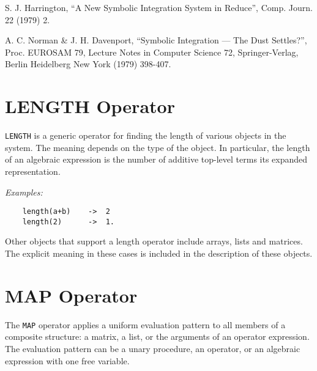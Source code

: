 	S. J. Harrington, ``A New Symbolic Integration System in Reduce'',
		Comp. Journ. 22 (1979) 2.

	A. C. Norman \& J. H. Davenport, ``Symbolic Integration --- The Dust
		Settles?'', Proc. EUROSAM 79, Lecture Notes in Computer
		Science 72, Springer-Verlag, Berlin Heidelberg New York
		(1979) 398-407.

%
%
%

\section{LENGTH Operator}
\hypertarget{operator:LENGTH}{}
{\tt LENGTH} is a generic operator for finding the
length of various objects in the system.  The meaning depends on the type
of the object.  In particular, the length of an algebraic expression is
the number of additive top-level terms its expanded representation.

{\it Examples:}
\begin{verbatim}
	length(a+b)    ->  2
	length(2)      ->  1.
\end{verbatim}
Other objects that support a length operator include arrays, lists and
matrices. The explicit meaning in these cases is included in the description
of these objects.

\section{MAP Operator}
\hypertarget{operator:MAP}{}

The {\tt MAP} operator applies a uniform evaluation pattern to all members
of a composite structure: a matrix, a list, or the arguments of an
operator expression.  The evaluation pattern can be a unary procedure, an
operator, or an algebraic expression with one free variable.

